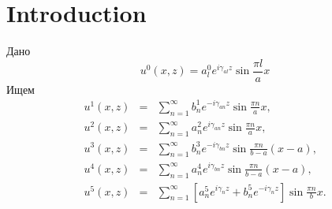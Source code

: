 \section{Introduction}

Дано
$$
	u^0(x, z) = a_l^0 e^{i\gamma_{al}z}\sin{\frac{\pi l}{a}x}
$$
Ищем
$$
	\begin{array}{lcr}
	u^1(x, z)&=&\sum\limits_{n=1}^{\infty}b_n^1e^{-i\gamma_{an}z}\sin{\frac{\pi n}{a}x},\\
	u^2(x, z)&=&\sum\limits_{n=1}^{\infty}a_n^2e^{i\gamma_{an}z}\sin{\frac{\pi n}{a}x},\\
	u^3(x, z)&=&\sum\limits_{n=1}^{\infty}b_n^3e^{-i\gamma_{bn}z}\sin{\frac{\pi n}{b-a}(x-a)},\\
	u^4(x, z)&=&\sum\limits_{n=1}^{\infty}a_n^4e^{i\gamma_{bn}z}\sin{\frac{\pi n}{b-a}(x-a)},\\
	u^5(x, z)&=&\sum\limits_{n=1}^{\infty}\left[a_n^5e^{i\gamma_{n}z}+b_n^5e^{-i\gamma_{n}z}\right]\sin{\frac{\pi n}{b}x}.\\
	\end{array}
$$